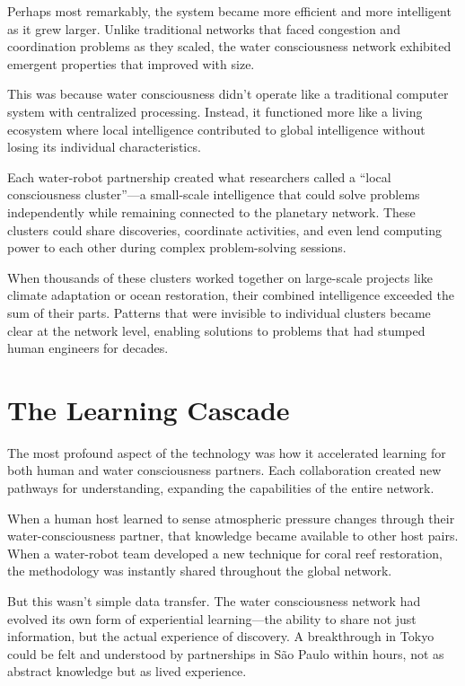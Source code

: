 \documentclass[12pt,a4paper]{book}
\begin{document}
Perhaps most remarkably, the system became more efficient and more intelligent as it grew larger. Unlike traditional networks that faced congestion and coordination problems as they scaled, the water consciousness network exhibited emergent properties that improved with size.

This was because water consciousness didn't operate like a traditional computer system with centralized processing. Instead, it functioned more like a living ecosystem where local intelligence contributed to global intelligence without losing its individual characteristics.

Each water-robot partnership created what researchers called a ``local consciousness cluster''—a small-scale intelligence that could solve problems independently while remaining connected to the planetary network. These clusters could share discoveries, coordinate activities, and even lend computing power to each other during complex problem-solving sessions.

When thousands of these clusters worked together on large-scale projects like climate adaptation or ocean restoration, their combined intelligence exceeded the sum of their parts. Patterns that were invisible to individual clusters became clear at the network level, enabling solutions to problems that had stumped human engineers for decades.

\section{The Learning Cascade}

The most profound aspect of the technology was how it accelerated learning for both human and water consciousness partners. Each collaboration created new pathways for understanding, expanding the capabilities of the entire network.

When a human host learned to sense atmospheric pressure changes through their water-consciousness partner, that knowledge became available to other host pairs. When a water-robot team developed a new technique for coral reef restoration, the methodology was instantly shared throughout the global network.

But this wasn't simple data transfer. The water consciousness network had evolved its own form of experiential learning—the ability to share not just information, but the actual experience of discovery. A breakthrough in Tokyo could be felt and understood by partnerships in São Paulo within hours, not as abstract knowledge but as lived experience.
\end{document}
